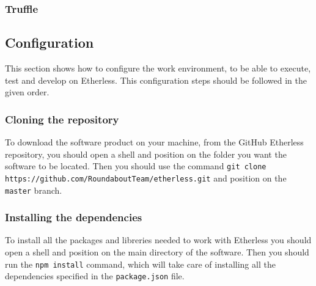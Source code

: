 \subsubsection{Truffle}
\subsection{Configuration}
This section shows how to configure the work environment, to be able to execute, test and develop on Etherless. This configuration steps should be followed in the given order.
\subsubsection{Cloning the repository}
To download the software product on your machine, from the GitHub Etherless repository, you should open a shell and position on the folder you want the software to be located. Then you should use the command \texttt{git clone https://github.com/RoundaboutTeam/etherless.git} and position on the \texttt{master} branch.
\subsubsection{Installing the dependencies}
To install all the packages and libreries needed to work with Etherless you should open a shell and position on the main directory of the software. Then you should run the \texttt{npm install} command, which will take care of installing all the dependencies specified in the \texttt{package.json} file. 

